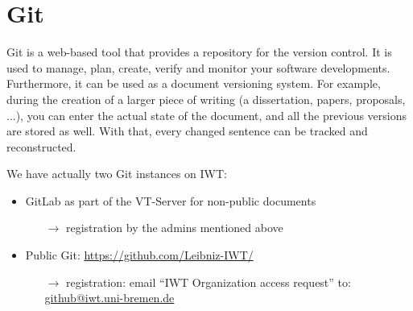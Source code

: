 \section{Git}

Git is a web-based tool that provides a repository for the version control.
It is used to manage, plan, create, verify and monitor your software
developments. Furthermore, it can be used as a document versioning system.
For example, during the creation of a larger piece of writing (a dissertation,
papers, proposals, ...), you can enter the actual state of the document,
and all the previous versions are stored as well. With that, every changed
sentence can be tracked and reconstructed.

We have actually two Git instances on IWT:
\begin{itemize}
  \item GitLab as part of the VT-Server for non-public documents
        \begin{itemize}
          \item[$\rightarrow$] registration by the admins mentioned above
        \end{itemize}
  \item Public Git: \url{https://github.com/Leibniz-IWT/}
        \begin{itemize}
          \item[$\rightarrow$] registration: email “IWT Organization access
                               request” to:
                               \href{mailto:github@iwt.uni-bremen.de}%
                               {github@iwt.uni-bremen.de}
        \end{itemize}
\end{itemize}
